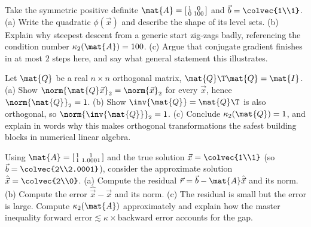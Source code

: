 \begin{exercise}
Take the symmetric positive definite $\mat{A}=\left[\begin{smallmatrix}1 & 0\\ 0 &
100\end{smallmatrix}\right]$ and $\vec{b}=\colvec{1\\1}$. (a) Write the quadratic
$\phi(\vec{x})$ and describe the shape of its level sets. (b) Explain why steepest
descent from a generic start zig-zags badly, referencing the condition number
$\kappa_2(\mat{A})=100$. (c) Argue that conjugate gradient finishes in at most $2$
steps here, and say what general statement this illustrates.
\end{exercise}

\begin{exercise}
Let $\mat{Q}$ be a real $n\times n$ orthogonal matrix, $\mat{Q}\T\mat{Q}=\mat{I}$.
(a) Show $\norm{\mat{Q}\vec{x}}_2=\norm{\vec{x}}_2$ for every $\vec{x}$, hence
$\norm{\mat{Q}}_2=1$. (b) Show $\inv{\mat{Q}}=\mat{Q}\T$ is also orthogonal, so
$\norm{\inv{\mat{Q}}}_2=1$. (c) Conclude $\kappa_2(\mat{Q})=1$, and explain in words why
this makes orthogonal transformations the safest building blocks in numerical linear
algebra.
\end{exercise}

\begin{exercise}
Using $\mat{A}=\left[\begin{smallmatrix}1 & 1\\ 1 & 1.0001\end{smallmatrix}\right]$ and
the true solution $\vec{x}=\colvec{1\\1}$ (so $\vec{b}=\colvec{2\\2.0001}$), consider
the approximate solution $\hat{\vec{x}}=\colvec{2\\0}$. (a) Compute the residual
$\vec{r}=\vec{b}-\mat{A}\hat{\vec{x}}$ and its norm. (b) Compute the error
$\hat{\vec{x}}-\vec{x}$ and its norm. (c) The residual is small but the error is large.
Compute $\kappa_2(\mat{A})$ approximately and explain how the master inequality
$\text{forward error}\lesssim\kappa\times\text{backward error}$ accounts for the gap.
\end{exercise}
